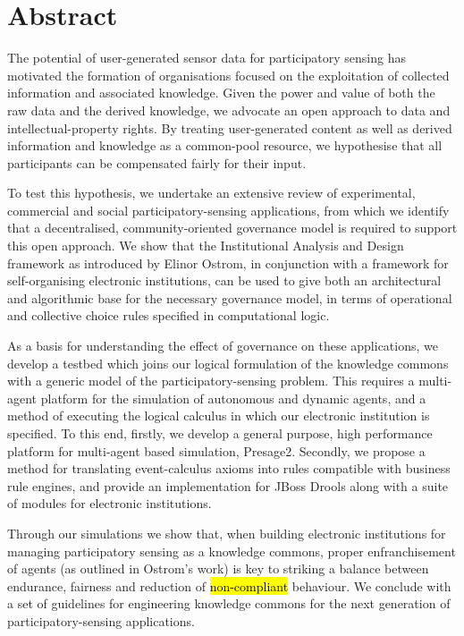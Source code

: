 \begingroup
\let\clearpage\relax
\let\cleardoublepage\relax
\let\cleardoublepage\relax

\chapter*{Abstract}

The potential of user-generated sensor data for participatory sensing has motivated the formation of organisations focused on the exploitation of collected information and associated knowledge. 
Given the power and value of both the raw data and the derived knowledge, we advocate an open approach to data and intellectual-property rights. By treating user-generated content as well as derived information and knowledge 
as a common-pool resource, we hypothesise that
all participants can be compensated fairly for their input.

To test this hypothesis, we undertake an extensive review of experimental, commercial and social participatory-sensing applications, from which we identify that a decentralised, community-oriented governance model is required
to support this open approach. We show that the Institutional Analysis and Design framework as introduced by Elinor Ostrom, in conjunction
with a framework for self-organising electronic institutions, can be used to give both an architectural
and algorithmic base for the necessary governance model, in terms of operational and collective choice rules
specified in computational logic.

As a basis for understanding the effect of governance on these applications, we develop a testbed which joins our logical formulation of the knowledge commons with a generic model of the participatory-sensing problem.
This requires a multi-agent platform for the simulation of autonomous and dynamic agents, and a method of executing the logical calculus in which our electronic institution is specified. 
To this end, firstly, we develop a general purpose, high performance platform for multi-agent based simulation, Presage2. 
Secondly, we propose a method for translating event-calculus axioms into rules compatible with business rule engines, and provide an implementation for JBoss Drools along with a suite of modules for electronic institutions.

Through our simulations we show that, when building electronic institutions for managing participatory sensing as a knowledge commons, proper enfranchisement of agents (as outlined in Ostrom's work) is key to striking a balance between endurance, fairness and reduction of \hl{non-compliant} behaviour. We conclude with a set of guidelines for engineering knowledge commons for the next generation of participatory-sensing applications.

